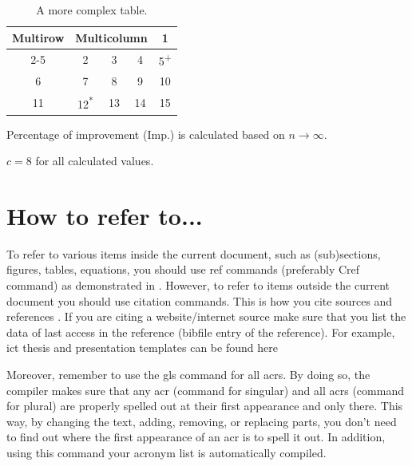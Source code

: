 \begin{table}[!h] %
    \centering
    \caption{A more complex table.}
    \label{tab_sample_complex}   
    \begin{threeparttable}
    \begin{tabular}{|c|c c c | c|}
         \hline
         \multirow{2}{*}{Multirow}  & \multicolumn{3}{c|}{Multicolumn} & 1\\
         \cline{2-5}
          & 2 & 3 & 4 & 5\textsuperscript{+} \\
         \hline \hline
         6 & 7 & 8 & 9 & 10 \\
         11 & 12\textsuperscript{*} & 13 & 14 & 15 \\
         \hline
    \end{tabular}
      \begin{tablenotes}
       \item[+] Percentage of improvement (Imp.) is calculated based on $n \to \infty$.
       \item[*]$c=8$ for all calculated values.
     \end{tablenotes}
     \end{threeparttable}
\end{table}


\section{How to refer to...}
To refer to various items inside the current document, such as (sub)sections, figures, tables, equations, you should use ref commands (preferably Cref command) as demonstrated in 
. However, to refer to items outside the current document you should use citation commands. This is how you cite sources and references \cite{Taherinejad2019LSCNewsletter}. If you are citing a website/internet source make sure that you list the data of last access in the reference (bibfile entry of the reference). For example, \gls{ict} thesis and presentation templates can be found here~\cite{templates2020}

Moreover, remember to use the gls command for all \glspl{acr}. By doing so, the compiler makes sure that any \gls{acr} (command for singular) and all \glspl{acr} (command for plural) are properly spelled out at their first appearance and only there. This way, by changing the text, adding, removing, or replacing parts, you don't need to find out where the first appearance of an \gls{acr} is to spell it out. In addition, using this command your acronym list is automatically compiled.


